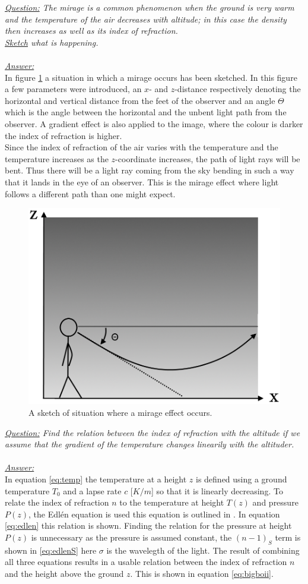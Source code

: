 \documentclass{article}
\begin{document}
\textit{\underline{Question:} The mirage is a common phenomenon when the ground is very warm and the temperature of the air decreases with altitude; in this case the density then increases as well as its index of refraction.\\
\underline{Sketch} what is happening.}\\
\\
\textit{\underline{Answer:}} \\
In figure \ref{fig:mirage} a situation in which a mirage occurs has been sketched. In this figure a few parameters were introduced, an $x$- and $z$-distance respectively denoting the horizontal and vertical distance from the feet of the observer and an angle $\Theta$ which is the angle between the horizontal and the unbent light path from the observer. A gradient effect is also applied to the image, where the colour is darker the index of refraction is higher.\\
Since the index of refraction of the air varies with the temperature and the temperature increases as the $z$-coordinate increases, the path of light rays will be bent. Thus there will be a light ray coming from the sky bending in such a way that it lands in the eye of an observer. This is the mirage effect where light follows a different path than one might expect.\\

\begin{figure}[h!]
	\centering
	\includegraphics[width=0.4\linewidth,keepaspectratio]{afbeeldingen/miraaj.png}
	\caption{A sketch of situation where a mirage effect occurs.}
	\label{fig:mirage}
\end{figure}
\textit{\underline{Question:} Find the relation between the index of refraction with the altitude if we assume that the gradient of the temperature changes linearily with the altituder.}\\
\\
\textit{\underline{Answer:}} \\
In equation \ref{eq:temp} the temperature at a height $z$ is defined using a ground temperature $T_0$ and a lapse rate $c$ [$K /m$] so that it is linearly decreasing. To relate the index of refraction $n$ to the temperature at height $T(z)$ and pressure $P(z)$, the Edl\'en equation is used this equation is outlined in \cite{Birch_1993}. In equation \ref{eq:edlen} this relation is shown. Finding the relation for the pressure at height $P(z)$ is unnecessary as the pressure is assumed constant, the $(n-1)_S$ term is shown in \ref{eq:edlenS} here $\sigma$ is the wavelegth of the light. The result of combining all three equations results in a usable relation between the index of refraction $n$ and the height above the ground $z$. This is shown in equation \ref{eq:bigboii}.\\
\end{document}
